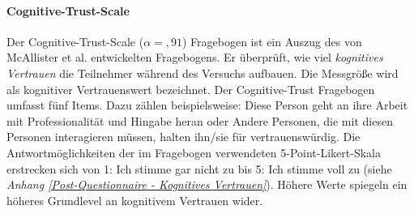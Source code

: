\documentclass[a4paper,11pt]{article}%
\renewcommand{\\}{\vspace*{0.5\baselineskip} \newline}
\begin{document}
%			

		\paragraph{Cognitive-Trust-Scale}
Der Cognitive-Trust-Scale ($\alpha =,91$) Fragebogen ist ein Auszug des von McAllister et al. \citep[S. 37]{mcallister1995affect} entwickelten Fragebogens. Er überprüft, wie viel \textit{kognitives Vertrauen} die Teilnehmer während des Versuchs aufbauen. Die Messgröße wird als kognitiver Vertrauenswert bezeichnet. Der Cognitive-Trust Fragebogen umfasst fünf Items. Dazu zählen beispielsweise: \glqq{}Diese Person geht an ihre Arbeit mit Professionalität und Hingabe heran\dq{} oder \glqq{}Andere Personen, die mit diesen Personen interagieren müssen, halten ihn/sie für vertrauenswürdig\dq{}. Die Antwortmöglichkeiten der im Fragebogen verwendeten 5-Point-Likert-Skala erstrecken sich von 1: \glqq{}Ich stimme gar nicht zu \dq{} bis 5: \glqq{}Ich stimme voll zu\dq{} (siehe \textit{Anhang \ref{Post-Questionnaire - Kognitives Vertrauen}}). Höhere Werte spiegeln ein höheres Grundlevel an kognitivem Vertrauen wider.

\end{document}
